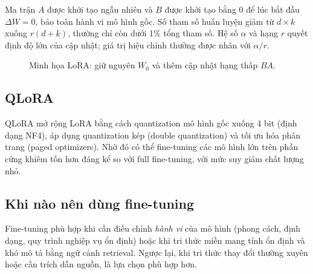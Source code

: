 Ma trận $A$ được khởi tạo ngẫu nhiên và $B$ được khởi tạo bằng 0 để lúc bắt đầu
$\Delta W = 0$, bảo toàn hành vi mô hình gốc. Số tham số huấn luyện giảm từ $d \times k$
xuống $r(d+k)$, thường chỉ còn dưới 1\% tổng tham số. Hệ số $\alpha$ và hạng $r$ quyết
định độ lớn của cập nhật; giá trị hiệu chỉnh thường được nhân với $\alpha/r$.

\begin{figure}[htbp]
\centering
{}
\caption{Minh họa LoRA: giữ nguyên $W_0$ và thêm cập nhật hạng thấp $BA$.}
\label{fig:lora}
\end{figure}

\subsection{QLoRA}

QLoRA \cite{dettmers2023qlora} mở rộng LoRA bằng cách quantization mô hình gốc xuống 4 bit
(định dạng NF4), áp dụng quantization kép (double quantization) và tối ưu hóa phân trang
(paged optimizers). Nhờ đó có thể fine-tuning các mô hình lớn trên phần cứng khiêm tốn hơn
đáng kể so với full fine-tuning, với mức suy giảm chất lượng nhỏ.

\subsection{Khi nào nên dùng fine-tuning}

Fine-tuning phù hợp khi cần điều chỉnh \emph{hành vi} của mô hình (phong cách, định dạng,
quy trình nghiệp vụ ổn định) hoặc khi tri thức miền mang tính ổn định và khó mô tả bằng
ngữ cảnh retrieval. Ngược lại, khi tri thức thay đổi thường xuyên hoặc cần trích dẫn nguồn,
\rag{} là lựa chọn phù hợp hơn.

